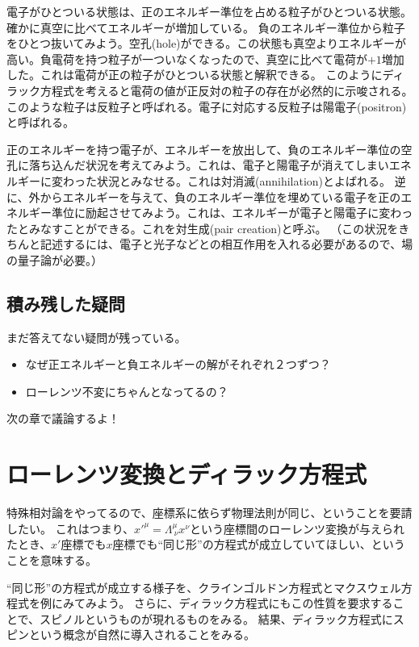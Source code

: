 \documentclass[10pt,a4paper]{jarticle}
\begin{document}
電子がひとついる状態は、正のエネルギー準位を占める粒子がひとついる状態。確かに真空に比べてエネルギーが増加している。
負のエネルギー準位から粒子をひとつ抜いてみよう。空孔(hole)ができる。この状態も真空よりエネルギーが高い。負電荷を持つ粒子が一ついなくなったので、真空に比べて電荷が$+1$増加した。これは電荷が正の粒子がひとついる状態と解釈できる。
このようにディラック方程式を考えると電荷の値が正反対の粒子の存在が必然的に示唆される。このような粒子は反粒子と呼ばれる。電子に対応する反粒子は陽電子(positron)と呼ばれる。

正のエネルギーを持つ電子が、エネルギーを放出して、負のエネルギー準位の空孔に落ち込んだ状況を考えてみよう。これは、電子と陽電子が消えてしまいエネルギーに変わった状況とみなせる。これは対消滅(annihilation)とよばれる。
逆に、外からエネルギーを与えて、負のエネルギー準位を埋めている電子を正のエネルギー準位に励起させてみよう。これは、エネルギーが電子と陽電子に変わったとみなすことができる。これを対生成(pair creation)と呼ぶ。
（この状況をきちんと記述するには、電子と光子などとの相互作用を入れる必要があるので、場の量子論が必要。）

\cite{Nielsen:1983rb}

\subsection{積み残した疑問}
まだ答えてない疑問が残っている。
\begin{itemize}
\item なぜ正エネルギーと負エネルギーの解がそれぞれ２つずつ？
\item ローレンツ不変にちゃんとなってるの？
\end{itemize}
次の章で議論するよ！



\section{ローレンツ変換とディラック方程式}
特殊相対論をやってるので、座標系に依らず物理法則が同じ、ということを要請したい。
これはつまり、${x'}^\mu = \Lambda^\mu_{~\nu} x^\nu$という座標間のローレンツ変換が与えられたとき、$x'$座標でも$x$座標でも``同じ形''の方程式が成立していてほしい、ということを意味する。

``同じ形''の方程式が成立する様子を、クラインゴルドン方程式とマクスウェル方程式を例にみてみよう。
さらに、ディラック方程式にもこの性質を要求することで、スピノルというものが現れるものをみる。
結果、ディラック方程式にスピンという概念が自然に導入されることをみる。
\end{document}

